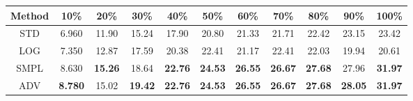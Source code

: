 \documentclass{standalone}
\begin{document}
\begin{tabular}{c|cccccccccc}
      \toprule
      Method & 10\% & 20\% & 30\% & 40\% & 50\% & 60\% & 70\% & 80\% & 90\% & 100\% \\
      \midrule
STD & 6.960 & 11.90 & 15.24 & 17.90 & 20.80 & 21.33 & 21.71 & 22.42 & 23.15 & 23.42\\
LOG & 7.350 & 12.87 & 17.59 & 20.38 & 22.41 & 21.17 & 22.41 & 22.03 & 19.94 & 20.61\\
SMPL & 8.630 & \textbf{15.26} & 18.64 & \textbf{22.76} & \textbf{24.53} & \textbf{26.55} & \textbf{26.67} & \textbf{27.68} & 27.96 & \textbf{31.97}\\
ADV & \textbf{8.780} & 15.02 & \textbf{19.42} & \textbf{22.76} & \textbf{24.53} & \textbf{26.55} & \textbf{26.67} & \textbf{27.68} & \textbf{28.05} & \textbf{31.97}\\
  \bottomrule
\end{tabular}
\end{document}

